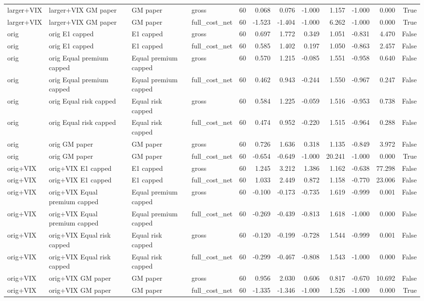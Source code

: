 \begin{tabular}{llllrrrrrrrr}
larger+VIX & larger+VIX GM paper & GM paper & gross & 60 & 0.068 & 0.076 & -1.000 & 1.157 & -1.000 & 0.000 & True \\
larger+VIX & larger+VIX GM paper & GM paper & full\_cost\_net & 60 & -1.523 & -1.404 & -1.000 & 6.262 & -1.000 & 0.000 & True \\
orig & orig E1 capped & E1 capped & gross & 60 & 0.697 & 1.772 & 0.349 & 1.051 & -0.831 & 4.470 & False \\
orig & orig E1 capped & E1 capped & full\_cost\_net & 60 & 0.585 & 1.402 & 0.197 & 1.050 & -0.863 & 2.457 & False \\
orig & orig Equal premium capped & Equal premium capped & gross & 60 & 0.570 & 1.215 & -0.085 & 1.551 & -0.958 & 0.640 & False \\
orig & orig Equal premium capped & Equal premium capped & full\_cost\_net & 60 & 0.462 & 0.943 & -0.244 & 1.550 & -0.967 & 0.247 & False \\
orig & orig Equal risk capped & Equal risk capped & gross & 60 & 0.584 & 1.225 & -0.059 & 1.516 & -0.953 & 0.738 & False \\
orig & orig Equal risk capped & Equal risk capped & full\_cost\_net & 60 & 0.474 & 0.952 & -0.220 & 1.515 & -0.964 & 0.288 & False \\
orig & orig GM paper & GM paper & gross & 60 & 0.726 & 1.636 & 0.318 & 1.135 & -0.849 & 3.972 & False \\
orig & orig GM paper & GM paper & full\_cost\_net & 60 & -0.654 & -0.649 & -1.000 & 20.241 & -1.000 & 0.000 & True \\
orig+VIX & orig+VIX E1 capped & E1 capped & gross & 60 & 1.245 & 3.212 & 1.386 & 1.162 & -0.638 & 77.298 & False \\
orig+VIX & orig+VIX E1 capped & E1 capped & full\_cost\_net & 60 & 1.033 & 2.449 & 0.872 & 1.158 & -0.770 & 23.006 & False \\
orig+VIX & orig+VIX Equal premium capped & Equal premium capped & gross & 60 & -0.100 & -0.173 & -0.735 & 1.619 & -0.999 & 0.001 & False \\
orig+VIX & orig+VIX Equal premium capped & Equal premium capped & full\_cost\_net & 60 & -0.269 & -0.439 & -0.813 & 1.618 & -1.000 & 0.000 & False \\
orig+VIX & orig+VIX Equal risk capped & Equal risk capped & gross & 60 & -0.120 & -0.199 & -0.728 & 1.544 & -0.999 & 0.001 & False \\
orig+VIX & orig+VIX Equal risk capped & Equal risk capped & full\_cost\_net & 60 & -0.299 & -0.467 & -0.808 & 1.543 & -1.000 & 0.000 & False \\
orig+VIX & orig+VIX GM paper & GM paper & gross & 60 & 0.956 & 2.030 & 0.606 & 0.817 & -0.670 & 10.692 & False \\
orig+VIX & orig+VIX GM paper & GM paper & full\_cost\_net & 60 & -1.335 & -1.346 & -1.000 & 1.526 & -1.000 & 0.000 & True \\
\bottomrule
\end{tabular}
